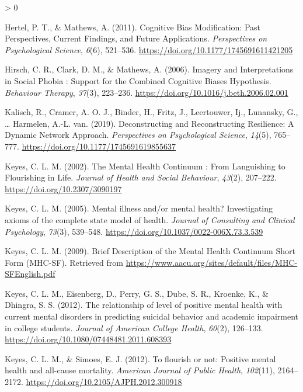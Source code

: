 \documentclass[
  english,
  man]{apa6}
\newlength{\cslhangindent}
\newenvironment{CSLReferences}[2] %
 {%
  \setlength{\parindent}{0pt}
  \ifodd #1 \everypar{\setlength{\hangindent}{\cslhangindent}}\ignorespaces\fi
  \ifnum #2 > 0
  \setlength{\parskip}{#2\baselineskip}
  \fi
 }%
 {}
\begin{document}
\begin{CSLReferences}{1}{0}
\leavevmode\hypertarget{ref-Hertel2011}{}%
Hertel, P. T., \& Mathews, A. (2011). Cognitive {Bias} {Modification}: {Past} {Perspectives}, {Current} {Findings}, and {Future} {Applications}. \emph{Perspectives on Psychological Science}, \emph{6}(6), 521--536. \url{https://doi.org/10.1177/1745691611421205}

\leavevmode\hypertarget{ref-Hirsch2006}{}%
Hirsch, C. R., Clark, D. M., \& Mathews, A. (2006). Imagery and {Interpretations} in {Social} {Phobia} : {Support} for the {Combined} {Cognitive} {Biases} {Hypothesis}. \emph{Behaviour Therapy}, \emph{37}(3), 223--236. \url{https://doi.org/10.1016/j.beth.2006.02.001}

\leavevmode\hypertarget{ref-kalisch_deconstructing_2019}{}%
Kalisch, R., Cramer, A. O. J., Binder, H., Fritz, J., Leertouwer, Ij., Lunansky, G., \ldots{} Harmelen, A.-L. van. (2019). Deconstructing and {Reconstructing} {Resilience}: {A} {Dynamic} {Network} {Approach}. \emph{Perspectives on Psychological Science}, \emph{14}(5), 765--777. \url{https://doi.org/10.1177/1745691619855637}

\leavevmode\hypertarget{ref-Keyes2002}{}%
Keyes, C. L. M. (2002). The {Mental} {Health} {Continuum} : {From} {Languishing} to {Flourishing} in {Life}. \emph{Journal of Health and Social Behaviour}, \emph{43}(2), 207--222. \url{https://doi.org/10.2307/3090197}

\leavevmode\hypertarget{ref-Keyes2005}{}%
Keyes, C. L. M. (2005). Mental illness and/or mental health? {Investigating} axioms of the complete state model of health. \emph{Journal of Consulting and Clinical Psychology}, \emph{73}(3), 539--548. \url{https://doi.org/10.1037/0022-006X.73.3.539}

\leavevmode\hypertarget{ref-Keyes2009}{}%
Keyes, C. L. M. (2009). Brief {Description} of the {Mental} {Health} {Continuum} {Short} {Form} ({MHC}-{SF}). Retrieved from \url{https://www.aacu.org/sites/default/files/MHC-SFEnglish.pdf}

\leavevmode\hypertarget{ref-Keyes2012a}{}%
Keyes, C. L. M., Eisenberg, D., Perry, G. S., Dube, S. R., Kroenke, K., \& Dhingra, S. S. (2012). The relationship of level of positive mental health with current mental disorders in predicting suicidal behavior and academic impairment in college students. \emph{Journal of American College Health}, \emph{60}(2), 126--133. \url{https://doi.org/10.1080/07448481.2011.608393}

\leavevmode\hypertarget{ref-Keyes2012}{}%
Keyes, C. L. M., \& Simoes, E. J. (2012). To flourish or not: Positive mental health and all-cause mortality. \emph{American Journal of Public Health}, \emph{102}(11), 2164--2172. \url{https://doi.org/10.2105/AJPH.2012.300918}


\end{CSLReferences}
\end{document}
